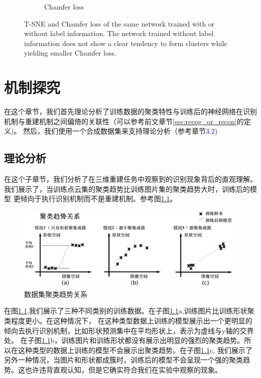 \documentclass[bachelor, nocolorlinks, printoneside]{seuthesis} %
\newcommand\TODO[1]{\textcolor{blue}{#1}}
\begin{document}
\begin{Main}
\begin{figure}
\begin{subfigure}[t]{0.2\linewidth}
    \caption{Chamfer loss}\label{fig:T-SNE3}
  \end{subfigure}
  \caption{\small T-SNE and Chamfer loss of the same network trained with or without label information. The network trained without label information does not show a clear tendency to form clusters while yielding smaller Chamfer loss.}\label{fig:T-SNE}
  \label{fig:TSNE-Chamfer}
\end{figure}


\chapter{机制探究}
在这个章节，我们首先理论分析了训练数据的聚类特性与训练后的神经网络在识别机制与重建机制之间偏倚的关联性（可以参考前文章节\ref{sec:recog_or_recon}的定义)。
然后，我们使用一个合成数据集来支持理论分析（参考章节\TODO{3.2})
\section{理论分析}\label{sec:thm}
在这个子章节，我们分析了在三维重建任务中观察到的识别现象背后的直观理解。我们展示了，当训练点云集的聚类趋势比训练图片集的聚类趋势大时，训练后的模型
更倾向于执行识别机制而不是重建机制。参考图\ref{fig:clustering_tendency}。

\begin{figure}
    \centering
    \includegraphics[width=.95\textwidth]{figs/drawing.png}
    \caption{\small 数据集聚类趋势关系}
    \label{fig:clustering_tendency}
\end{figure}

在图\ref{fig:clustering_tendency},我们展示了三种不同类别的训练数据。在子图\ref{fig:clustering_tendency}a,训练图片比训练形状聚类程度更小。在这种情况下，
在这种类型数据上训练的模型展示出一个更明显的倾向去执行识别机制，比如形状预测集中在平均形状上，表示为虚线与y轴的交界处。
在子图\ref{fig:clustering_tendency}b，训练图片和训练形状都没有展示出明显的强烈的聚类趋势。所以在这种类型的数据上训练的模型不会展示出聚类趋势。在子图\ref{fig:clustering_tendency}c,
我们展示了另外一种情况，当图片和形状都成簇时，训练后的模型不会呈现一个强的聚类趋势。这也许违背直观认知，但是它确实符合我们在实验中观察的现象。


\end{Main}
\end{document}
